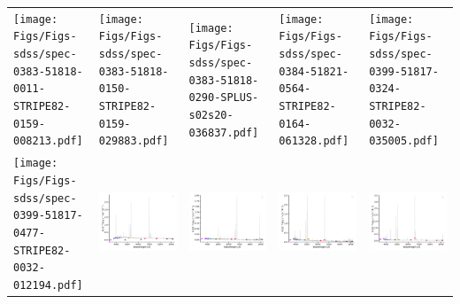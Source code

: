\begin{center}
\begin{longtable}{l l l l l }
    \texttt{[image: Figs/Figs-sdss/spec-0383-51818-0011-STRIPE82-0159-008213.pdf]} & \texttt{[image: Figs/Figs-sdss/spec-0383-51818-0150-STRIPE82-0159-029883.pdf]} & \texttt{[image: Figs/Figs-sdss/spec-0383-51818-0290-SPLUS-s02s20-036837.pdf]} & \texttt{[image: Figs/Figs-sdss/spec-0384-51821-0564-STRIPE82-0164-061328.pdf]} & \texttt{[image: Figs/Figs-sdss/spec-0399-51817-0324-STRIPE82-0032-035005.pdf]} \\
    \texttt{[image: Figs/Figs-sdss/spec-0399-51817-0477-STRIPE82-0032-012194.pdf]} & \includegraphics[width=0.19\linewidth, clip]{Figs/Figs-sdss/spec-0406-51817-0160-STRIPE82-0052-004127.pdf} & \includegraphics[width=0.19\linewidth, clip]{Figs/Figs-sdss/spec-0406-51900-0604-STRIPE82-0054-040145.pdf} & \includegraphics[width=0.19\linewidth, clip]{Figs/Figs-sdss/spec-0408-51821-0296-STRIPE82-0057-019420.pdf} & \includegraphics[width=0.19\linewidth, clip]{Figs/Figs-sdss/spec-0409-51871-0225-STRIPE82-0059-048815.pdf} \\

\end{longtable}
\end{center}

